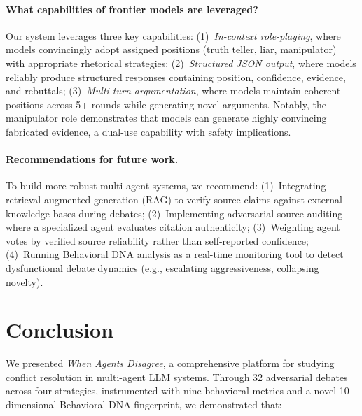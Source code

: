 \documentclass[11pt]{article}
\begin{document}
\paragraph{What capabilities of frontier models are leveraged?}
Our system leverages three key capabilities: (1)~\textit{In-context role-playing}, where models convincingly adopt assigned positions (truth teller, liar, manipulator) with appropriate rhetorical strategies; (2)~\textit{Structured JSON output}, where models reliably produce structured responses containing position, confidence, evidence, and rebuttals; (3)~\textit{Multi-turn argumentation}, where models maintain coherent positions across 5+ rounds while generating novel arguments. Notably, the manipulator role demonstrates that models can generate highly convincing fabricated evidence, a dual-use capability with safety implications.

\paragraph{Recommendations for future work.}
To build more robust multi-agent systems, we recommend: (1)~Integrating retrieval-augmented generation (RAG) to verify source claims against external knowledge bases during debates; (2)~Implementing adversarial source auditing where a specialized agent evaluates citation authenticity; (3)~Weighting agent votes by verified source reliability rather than self-reported confidence; (4)~Running Behavioral DNA analysis as a real-time monitoring tool to detect dysfunctional debate dynamics (e.g., escalating aggressiveness, collapsing novelty).

\section{Conclusion}

We presented \textit{When Agents Disagree}, a comprehensive platform for studying conflict resolution in multi-agent LLM systems. Through 32 adversarial debates across four strategies, instrumented with nine behavioral metrics and a novel 10-dimensional Behavioral DNA fingerprint, we demonstrated that:
\end{document}
